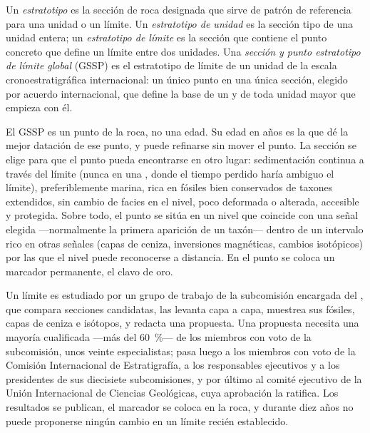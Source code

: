 \begin{definition}\label{def:b1:stratigraphic-scale:gssp}
Un \emph{estratotipo} es la sección de roca designada que sirve de patrón de referencia para una unidad o un límite. Un \emph{estratotipo de unidad} es la sección tipo de una
unidad entera; un \emph{estratotipo de límite} es la sección que contiene el punto concreto que define un límite entre dos unidades. Una \emph{sección y punto estratotipo de límite global} (GSSP)
es el estratotipo de límite de un
unidad de la escala cronoestratigráfica internacional: un único punto en una única sección, elegido por acuerdo internacional, que define la base de un  y de toda unidad mayor que empieza con él.
\end{definition}

El GSSP es un punto de la roca, no una edad. Su edad en años es la que dé la mejor datación de ese punto, y puede refinarse sin mover el punto. La sección se elige para que el punto pueda encontrarse en otro lugar: sedimentación continua a través del límite (nunca en una , donde el tiempo perdido haría ambiguo el límite),
preferiblemente marina, rica en fósiles bien conservados de taxones extendidos, sin cambio de facies en el nivel, poco deformada o alterada, accesible y protegida. Sobre todo, el punto se sitúa en un nivel que coincide con una señal elegida ---normalmente la primera aparición de un taxón---
dentro de un intervalo rico en otras señales (capas de ceniza, inversiones magnéticas, cambios isotópicos) por las que el nivel puede reconocerse a distancia. En el punto se coloca un marcador permanente, el clavo de oro.

\begin{inthefield}
Un límite es estudiado por un grupo de trabajo de la subcomisión encargada del , que compara secciones candidatas, las levanta capa a capa, muestrea sus fósiles, capas de ceniza e isótopos, y redacta una propuesta. Una propuesta necesita una mayoría cualificada ---más del \qty{60}{\%}--- de los miembros con voto de la subcomisión, unos veinte especialistas; pasa luego a los miembros con voto de la Comisión Internacional de Estratigrafía, a los responsables ejecutivos y a los presidentes de sus diecisiete subcomisiones, y por último al comité ejecutivo de la Unión Internacional de Ciencias Geológicas, cuya aprobación la ratifica. Los resultados se publican, el marcador se coloca en la roca, y durante diez años no puede proponerse ningún cambio en un límite recién establecido.
\end{inthefield}

